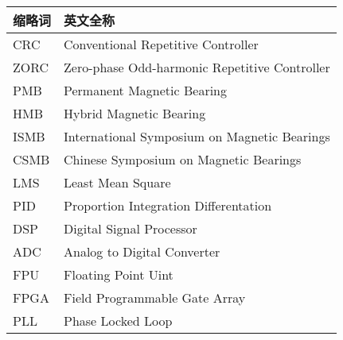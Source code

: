 \noindent\begin{tabu} to \textwidth {|X[1,c]|X[4,c]|}\hline
缩略词 & 英文全称 \\ \hline
CRC & Conventional Repetitive Controller \\ \hline
ZORC & Zero-phase Odd-harmonic Repetitive Controller \\ \hline
PMB & Permanent Magnetic Bearing \\ \hline
HMB & Hybrid Magnetic Bearing \\ \hline
ISMB & International Symposium on Magnetic Bearings \\ \hline
CSMB & Chinese Symposium on Magnetic Bearings \\ \hline
LMS & Least Mean Square \\ \hline
PID & Proportion Integration Differentation\\ \hline
DSP & Digital Signal Processor \\ \hline
ADC & Analog to Digital Converter\\ \hline
FPU & Floating Point Uint\\ \hline
FPGA & Field Programmable Gate Array\\ \hline
PLL & Phase Locked Loop\\ \hline
\end{tabu}
